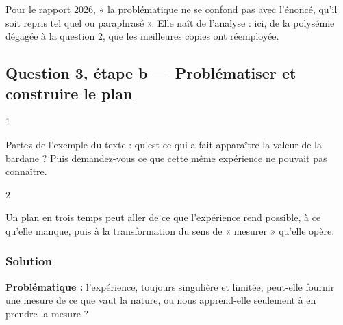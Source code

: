 \documentclass[11pt,a4paper]{article}
\begin{document}
\begin{jury}

Pour le rapport 2026, « la problématique ne se confond pas avec l'énoncé, qu'il soit repris tel quel ou paraphrasé ». Elle naît de l'analyse : ici, de la polysémie dégagée à la question 2, que les meilleures copies ont réemployée.

\end{jury}

\hypertarget{question-3-uxe9tape-b-probluxe9matiser-et-construire-le-plan}{%
\subsection{Question 3, étape b --- Problématiser et construire le plan}\label{question-3-uxe9tape-b-probluxe9matiser-et-construire-le-plan}}

\begin{indication}{1}

Partez de l'exemple du texte : qu'est-ce qui a fait apparaître la valeur de la bardane ? Puis demandez-vous ce que cette même expérience ne pouvait pas connaître.

\end{indication}

\begin{indication}{2}

Un plan en trois temps peut aller de ce que l'expérience rend possible, à ce qu'elle manque, puis à la transformation du sens de « mesurer » qu'elle opère.

\end{indication}

\hypertarget{solution-4}{%
\subsubsection{Solution}\label{solution-4}}

\textbf{Problématique :} l'expérience, toujours singulière et limitée, peut-elle fournir une mesure de ce que vaut la nature, ou nous apprend-elle seulement à en prendre la mesure ?
\end{document}

